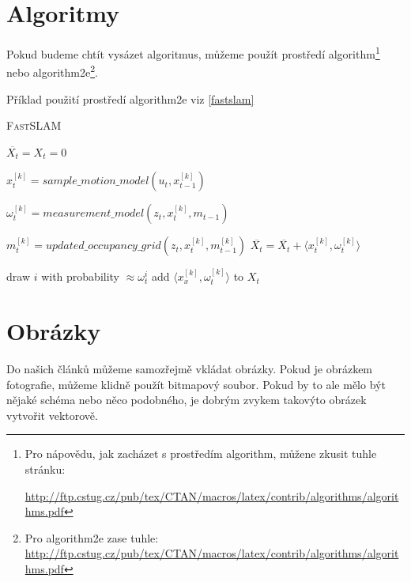 \documentclass[a4paper,11pt,draft]{article}
\begin{document}
\pagebreak



\section{Algoritmy}
\label{algos}

{\raggedright
Pokud budeme chtít vysázet algoritmus, můžeme použít prostředí {\ttfamily algorithm}\footnote{Pro nápovědu, jak zacházet s prostředím {\ttfamily algorithm}, můžene zkusit tuhle stránku: \raggedright{
\url{http://ftp.cstug.cz/pub/tex/CTAN/macros/latex/contrib/algorithms/algorithms.pdf}}} nebo {\ttfamily algorithm2e}\footnote{Pro {\ttfamily algorithm2e} zase tuhle: \url{http://ftp.cstug.cz/pub/tex/CTAN/macros/latex/contrib/algorithms/algorithms.pdf}}.
 
Příklad použití prostředí  {\ttfamily algorithm2e} viz \autoref{fastslam}}
\IncMargin{1.5em}
\begin{algorithm}[h]
	\caption{\textsc{FastSLAM}}
	\label{fastslam}
	\DontPrintSemicolon
	\SetAlgoLongEnd
	\SetAlgoNoLine
	\Indm\Indm
	\BlankLine
	\Indp\Indp
	$\overline{X_t} = X_t = 0$\;
	{
		$x^{[k]}_{t} = sample\_motion\_model(u_t,x_{t-1}^{[k]})$\;
		
		$\omega^{[k]}_{t} = measurement\_model(z_t,x^{[k]}_{t}, m_{t-1})$\;
		
		$m^{[k]}_{t} = updated\_occupancy\_grid(z_t, x^{[k]}_{t},m_{t-1}^{[k]})$\;
		$\overline{X_t} = \overline{X_t} + \langle x^{[k]}_{t}, \omega^{[k]}_{t} \rangle$
	}	
	{
		draw $i$ with probability $\approx \omega^{i}_t$\;
		add $\langle x^{[k]}_{x}, \omega^{[k]}_{t} \rangle$ to $X_t$\;
	}

\end{algorithm}
\DecMargin{1.5em}

\section{Obrázky}

Do našich článků můžeme samozřejmě vkládat obrázky. Pokud je obrázkem fotografie, můžeme klidně použít bitmapový soubor. Pokud by to ale mělo být nějaké schéma nebo něco podobného, je dobrým zvykem takovýto obrázek vytvořit vektorově.
\end{document}
